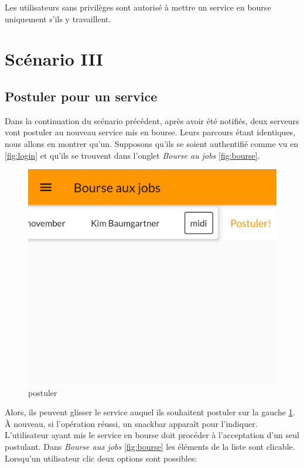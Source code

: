 Les utilisateurs sans privilèges sont autorisé à mettre un service en bourse uniquement s'ils y travaillent.

\section[Postuler pour un service - Scénario III]{Scénario III}
    \subsection*{Postuler pour un service}
    Dans la continuation du scénario précédent, après avoir été notifiés,
    deux serveurs vont postuler au nouveau service mis
    en bourse. Leurs parcours étant identiques, nous allons en montrer qu'un.
    Supposons qu'ils se soient authentifié comme vu en \ref{fig:login} et qu'ils se trouvent
    dans l'onglet \textit{Bourse au jobs} \ref{fig:bourse}.
    \vfill
    \begin{figure}[h]
        \centering
        \includegraphics[width=.3\linewidth]{screenshots/scenario_03/postuler.png}
        \caption{postuler}
        \label{fig:postuler}
    \end{figure}
    \vfill
    Alors, ils peuvent glisser le service auquel ils souhaitent postuler sur
    la gauche \ref{fig:postuler}. À nouveau, si l'opération réussi, un snackbar apparaît pour l'indiquer.
    \newpage
    L'utilisateur ayant mis le service en bourse doit procéder à l'acceptation
    d'un seul postulant. Dans \textit{Bourse aux jobs} \ref{fig:bourse} les éléments de 
    la liste sont clicable. Lorsqu'un utilisateur clic deux options sont possibles:
    \smallskip

